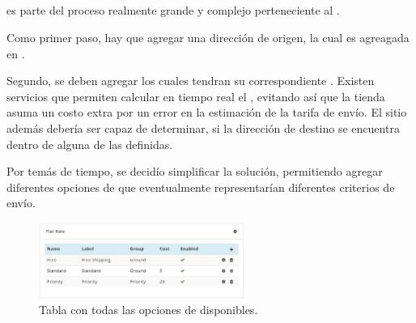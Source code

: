 \subsection{\shippingEF}\label{cap:solucionImplementada:section:dashboard:subsection:shipping}

\shippingEF es parte del proceso realmente grande y complejo perteneciente al \workflowCPT \orderFulfillmentCOM. 

Como primer paso, hay que agregar una dirección de origen, la cual es agreagada en .

Segundo, se deben agregar \shippingZonesCOM los cuales tendran su correspondiente \shippingRatesCOM. Existen servicios que permiten calcular en tiempo real el \shippingRatesCOM, evitando así que la tienda asuma un costo extra por un error en la estimación de la tarifa de envío. El sitio además debería ser capaz de determinar, si la dirección de destino se encuentra dentro de alguna de las \shippingZonesCOM definidas.


Por temás de tiempo, se decidío simplificar la solución, permitiendo agregar diferentes opciones de \shippingEF que eventualmente representarían diferentes criterios de envío.


\begin{figure}[H]
	\centering
	\includegraphics[width=0.6\textwidth]{figuras/dashboard/shipping/shipping_options.png}
	\caption{Tabla con todas las opciones de \shippingEF disponibles.}
	\label{figure:dashboard:shipping:shipping_options}
\end{figure}

